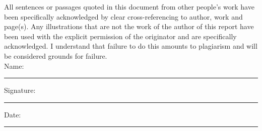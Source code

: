 \documentclass[11pt,oneside]{book}
\begin{document}
All sentences or passages quoted in this document from other people's work have been specifically acknowledged by clear cross-referencing to author, work and page(s).  Any illustrations that are not the work of the author of this report have been used with the explicit permission of the originator and are specifically acknowledged.  I understand that failure to do this amounts to plagiarism and will be considered grounds for failure.\\[1cm]

\noindent Name:\\[1mm]
\rule[1em]{25em}{0.5pt}

\noindent Signature:\\[1mm]
\rule[1em]{25em}{0.5pt}

\noindent Date:\\[1mm]
\rule[1em]{25em}{0.5pt}






\tableofcontents
\listoffigures
\listoftables



\mainmatter









 
 



\begin{appendices}

\end{appendices}
\end{document}
